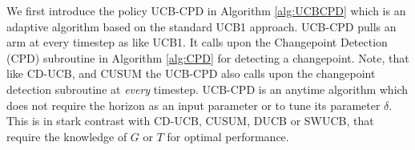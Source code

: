 
We first introduce the policy UCB-CPD in Algorithm \ref{alg:UCBCPD} which is an adaptive algorithm based on the standard UCB1 \citep{auer2002finite} approach. UCB-CPD pulls an arm at every timestep as like UCB1. It calls upon the Changepoint Detection (CPD)  subroutine in Algorithm \ref{alg:CPD} for detecting a changepoint. Note, that like CD-UCB, and CUSUM the UCB-CPD also calls upon the changepoint detection subroutine at \emph{every} timestep. UCB-CPD is an anytime algorithm which does not require the horizon as an input parameter or to tune its parameter $\delta$. This is in stark contrast with CD-UCB, CUSUM, DUCB or SWUCB, that require the knowledge of $G$ or $T$ for optimal performance.

\noindent
\begin{minipage}[r][\dimexpr 0.34\textheight-2\fboxsep-2\fboxrule\relax][t]{\dimexpr .5\textwidth-2\fboxsep-2\fboxrule\relax}
    \noindent
\end{minipage}
    
